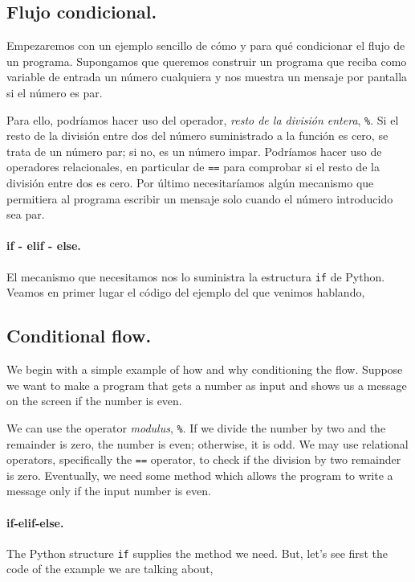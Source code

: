\begin{paracol}{2}
\subsection{Flujo condicional.}
Empezaremos con un ejemplo sencillo de cómo y para qué condicionar el flujo de un programa. Supongamos que queremos construir un programa que reciba como variable de entrada un número cualquiera y nos muestra un mensaje por pantalla si el número es par.

Para ello, podríamos hacer uso del operador, \emph{resto de la división entera}, \texttt{\%}. Si el resto de la división entre dos del número suministrado a la función es cero, se trata de un número par; si no, es un número impar. Podríamos hacer uso de operadores relacionales, en particular de \texttt{==} para comprobar si el resto de la división entre dos es cero. Por último necesitaríamos algún mecanismo que permitiera al programa escribir un mensaje solo cuando el número introducido sea par.

\paragraph{if - elif - else.} El mecanismo que necesitamos nos lo suministra la estructura \texttt{if} de Python. Veamos en primer lugar el código del ejemplo del que venimos hablando,
\switchcolumn
\subsection{Conditional flow.} 
We begin with a simple example of how and why conditioning the flow. Suppose we want to make a program that gets a number as input and shows us a message on the screen if the number is even.  

We can use the operator \emph{modulus}, \texttt{\%}. If we divide the number by two and the remainder is zero, the number is even; otherwise, it is odd. We may use relational operators, specifically the \texttt{==} operator, to check if the division by two remainder is zero. Eventually, we need some method which allows the program to write a message only if the input number is even.

\paragraph{if-elif-else.} The Python structure \texttt{if} supplies the method we need. But, let's see first the code of the example we are talking about,
\end{paracol}

